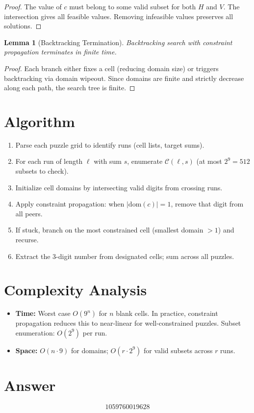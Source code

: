 \documentclass[12pt]{article}
\newtheorem{lemma}[theorem]{Lemma}
\begin{document}
\begin{proof}
The value of $c$ must belong to some valid subset for both $H$ and $V$. The intersection gives all feasible values. Removing infeasible values preserves all solutions.
\end{proof}

\begin{lemma}[Backtracking Termination]
Backtracking search with constraint propagation terminates in finite time.
\end{lemma}

\begin{proof}
Each branch either fixes a cell (reducing domain size) or triggers backtracking via domain wipeout. Since domains are finite and strictly decrease along each path, the search tree is finite.
\end{proof}

\section{Algorithm}
\begin{enumerate}
    \item Parse each puzzle grid to identify runs (cell lists, target sums).
    \item For each run of length $\ell$ with sum $s$, enumerate $\mathcal{C}(\ell,s)$ (at most $2^9 = 512$ subsets to check).
    \item Initialize cell domains by intersecting valid digits from crossing runs.
    \item Apply constraint propagation: when $|\mathrm{dom}(c)| = 1$, remove that digit from all peers.
    \item If stuck, branch on the most constrained cell (smallest domain $>1$) and recurse.
    \item Extract the 3-digit number from designated cells; sum across all puzzles.
\end{enumerate}

\section{Complexity Analysis}
\begin{itemize}
    \item \textbf{Time:} Worst case $O(9^n)$ for $n$ blank cells. In practice, constraint propagation reduces this to near-linear for well-constrained puzzles. Subset enumeration: $O(2^9)$ per run.
    \item \textbf{Space:} $O(n \cdot 9)$ for domains; $O(r \cdot 2^9)$ for valid subsets across $r$ runs.
\end{itemize}

\section{Answer}

\[
\boxed{1059760019628}
\]
\end{document}
